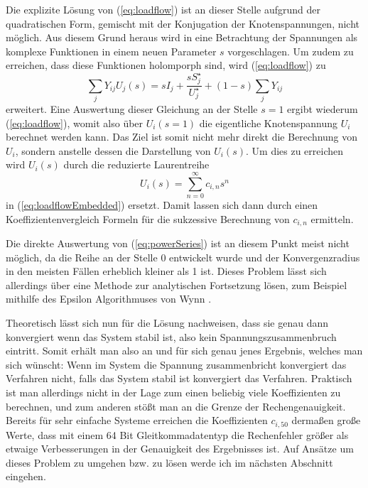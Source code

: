 \documentclass[12pt,a4paper]{article}
\newcommand{\refeq}[1]{{(\ref{#1})}}
\begin{document}
	Die explizite Lösung von \refeq{eq:loadflow} ist an dieser Stelle aufgrund der quadratischen Form, gemischt mit der Konjugation der Knotenspannungen, nicht möglich. Aus diesem Grund heraus wird in \cite{helmPatentSept2009} eine Betrachtung der Spannungen als komplexe Funktionen in einem neuen Parameter $s$ vorgeschlagen. Um zudem zu erreichen, dass diese Funktionen holomporph sind, wird \refeq{eq:loadflow} zu 
	\begin{equation}
		\sum_j Y_{ij} U_{j}(s) = s I_j + \frac{s S_j^\star}{U_j^\star} + (1 - s) \sum_j Y_{ij}
		\label{eq:loadflowEmbedded}
	\end{equation}
	erweitert. Eine Auswertung dieser Gleichung an der Stelle $s = 1$ ergibt wiederum \refeq{eq:loadflow}, womit also über $U_i(s = 1)$ die eigentliche Knotenspannung $U_i$ berechnet werden kann. Das Ziel ist somit nicht mehr direkt die Berechnung von $U_i$, sondern anstelle dessen die Darstellung von $U_i(s)$. Um dies zu erreichen wird $U_i(s)$ durch die reduzierte Laurentreihe 
	\begin{equation}
		U_i(s) = \sum_{n = 0}^\infty c_{i,n} s^n
		\label{eq:powerSeries}
	\end{equation}
	in \refeq{eq:loadflowEmbedded} ersetzt. Damit lassen sich dann durch einen Koeffizientenvergleich Formeln für die sukzessive Berechnung von $c_{i,n}$ ermitteln.
	
	Die direkte Auswertung von \refeq{eq:powerSeries} ist an diesem Punkt meist nicht möglich, da die Reihe an der Stelle 0 entwickelt wurde und der Konvergenzradius in den meisten Fällen erheblich kleiner als 1 ist. Dieses Problem lässt sich allerdings über eine Methode zur analytischen Fortsetzung lösen, zum Beispiel mithilfe des Epsilon Algorithmuses von Wynn \cite{epsilonWynn}.
	
	Theoretisch lässt sich nun für die Lösung nachweisen, dass sie genau dann konvergiert wenn das System stabil ist, also kein Spannungszusammenbruch eintritt. Somit erhält man also an und für sich genau jenes Ergebnis, welches man sich wünscht: Wenn im System die Spannung zusammenbricht konvergiert das Verfahren nicht, falls das System stabil ist konvergiert das Verfahren. Praktisch ist man allerdings nicht in der Lage zum einen beliebig viele Koeffizienten zu berechnen, und zum anderen stößt man an die Grenze der Rechengenauigkeit. Bereits für sehr einfache Systeme erreichen die Koeffizienten $c_{i,50}$ dermaßen große Werte, dass mit einem 64 Bit Gleitkommadatentyp die Rechenfehler größer als etwaige Verbesserungen in der Genauigkeit des Ergebnisses ist. Auf Ansätze um dieses Problem zu umgehen bzw. zu lösen werde ich im nächsten Abschnitt eingehen.
	
\end{document}
